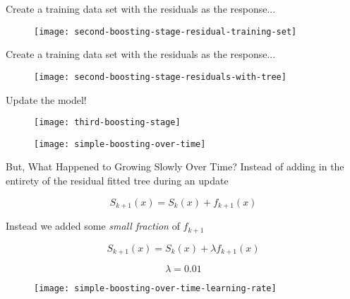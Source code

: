 \begin{frame}
Create a training data set with the residuals as the response...

  \begin{figure}
    \texttt{[image: second-boosting-stage-residual-training-set]}
  \end{figure}
  
\end{frame}
%

\begin{frame}
Create a training data set with the residuals as the response...

  \begin{figure}
    \texttt{[image: second-boosting-stage-residuals-with-tree]}
  \end{figure}
  
\end{frame}
%

\begin{frame}
Update the model!

  \begin{figure}
    \texttt{[image: third-boosting-stage]}
  \end{figure}
  
\end{frame}
%

\begin{frame}

  \begin{figure}
    \texttt{[image: simple-boosting-over-time]}
  \end{figure}
  
\end{frame}
%

\begin{frame}{But, What Happened to Growing Slowly Over Time?}
Instead of adding in the entirety of the residual fitted tree during an update

$$ S_{k+1}(x) = S_{k}(x) + f_{k+1}(x) $$

Instead we added some \textit{small fraction} of $f_{k+1}$

$$ S_{k+1}(x) = S_{k}(x) + \lambda f_{k+1}(x) $$
\end{frame}
%

%

\begin{frame}
$$ \lambda = 0.01 $$

  \begin{figure}
    \texttt{[image: simple-boosting-over-time-learning-rate]}
  \end{figure}

\end{frame}
%

